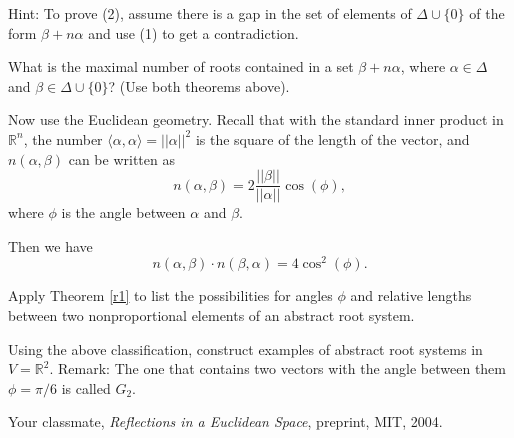 \documentclass[11pt]{amsart}
\newcommand{\R}{\mathbb R}
\newcommand{\la}{\langle}
\newcommand{\ra}{\rangle}
\begin{document}
Hint: To prove (2), assume there is a gap in the set of elements 
of $\Delta \cup \{0\}$ of the form $\beta + n \alpha$ and use (1) 
to get a contradiction. 


What is the maximal number of roots contained in a set $\beta + n \alpha$, 
where $\alpha \in \Delta$ and $\beta \in \Delta \cup \{0\}$? (Use both 
theorems above). 

Now  use the Euclidean geometry.  Recall that 
with the standard inner product in $\R^n$, the number 
$\la \alpha, \alpha \ra = || \alpha ||^2$ 
is the square of the length of the vector, and $ n(\alpha, \beta)$ 
can be written as  
$$ n(\alpha, \beta) = 2 \frac{||\beta ||}{||\alpha||} \cos(\phi), $$
where $\phi$ is the angle between $\alpha $ and $\beta$. 

Then we have 
$$ n(\alpha, \beta) \cdot n(\beta, \alpha) = 4 \cos^2(\phi).$$ 

Apply Theorem \ref{r1} to 
list the possibilities for angles $\phi$ and relative lengths 
between two nonproportional 
elements of an abstract root system. 

Using the above classification, construct examples of abstract root systems in 
$V= \R^2$.   
Remark: The one that contains two vectors with the angle between them 
$\phi=\pi/6$ is called $G_2$. 


\begin{thebibliography}{2}

 Your classmate, {\it Reflections in a Euclidean Space}, 
preprint, MIT, 2004. 


\end{thebibliography}
\end{document}
